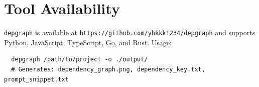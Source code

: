 \documentclass[11pt,a4paper]{article}
\begin{document}
\section*{Tool Availability}
\texttt{depgraph} is available at \texttt{https://github.com/yhkkk1234/depgraph} and supports Python, JavaScript, TypeScript, Go, and Rust. Usage:
\begin{verbatim}
  depgraph /path/to/project -o ./output/
  # Generates: dependency_graph.png, dependency_key.txt, prompt_snippet.txt
\end{verbatim}

\end{document}
